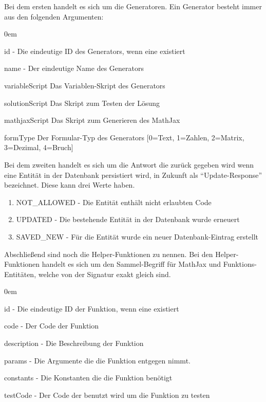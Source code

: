 Bei dem ersten handelt es sich um die Generatoren. Ein Generator besteht immer aus den folgenden Argumenten: \\
\begin{description}
\itemsep0em
\item id - Die eindeutige ID des Generators, wenn eine existiert
\item name - Der eindeutige Name des Generators
\item variableScript Das Variablen-Skript des Generators
\item solutionScript Das Skript zum Testen der Lösung
\item mathjaxScript Das Skript zum Generieren des MathJax
\item formType Der Formular-Typ des Generators [0=Text, 1=Zahlen, 2=Matrix, 3=Dezimal, 4=Bruch]
\end{description}

Bei dem zweiten handelt es sich um die Antwort die zurück gegeben wird wenn eine Entität in der Datenbank persistiert wird, in Zukunft als ``Update-Response'' bezeichnet. Diese kann drei Werte haben. \\
\begin{enumerate}
\itemsep0em
\item NOT\_ALLOWED - Die Entität enthält nicht erlaubten Code \\
\item UPDATED - Die bestehende Entität in der Datenbank wurde erneuert \\
\item SAVED\_NEW - Für die Entität wurde ein neuer Datenbank-Eintrag erstellt \\
\end{enumerate}

Abschließend sind noch die Helper-Funktionen zu nennen. Bei den Helper-Funktionen handelt es sich um den Sammel-Begriff für MathJax und Funktions-Entitäten, welche von der Signatur exakt gleich sind. \\
\begin{description}
\itemsep0em
\item id - Die eindeutige ID der Funktion, wenn eine existiert
\item code - Der Code der Funktion
\item description - Die Beschreibung der Funktion
\item params - Die Argumente die die Funktion entgegen nimmt.
\item constants - Die Konstanten die die Funktion benötigt
\item testCode - Der Code der benutzt wird um die Funktion zu testen
\end{description}


